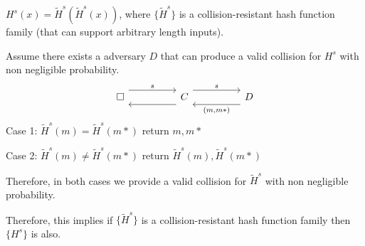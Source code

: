 \documentclass[12pt, letterpaper]{article}
\begin{document}
\begin{subproblem}{}
    $H^s(x) = \widetilde{H}^s(\widetilde{H}^s(x))$, where $\{\widetilde{H}^s\}$ is a collision-resistant hash
    function family (that can support arbitrary length inputs).
\end{subproblem}
\begin{problemproof}
    Assume there exists a adversary $D$ that can produce a valid collision for $H^s$ with non negligible probability.
\[\begin{tikzcd}
	\square && C && D
	\arrow["s", shift left=3, from=1-1, to=1-3]
	\arrow["{}", shift left=3, from=1-3, to=1-1]
	\arrow["s", shift left=3, from=1-3, to=1-5]
	\arrow["{(m,m*)}", shift left=3, from=1-5, to=1-3]
\end{tikzcd}\]
Case 1: $\widetilde{H}^s(m)=\widetilde{H}^s(m*)$ return $m,m*$

Case 2: $\widetilde{H}^s(m)\neq\widetilde{H}^s(m*)$ return $\widetilde{H}^s(m),\widetilde{H}^s(m*)$

Therefore, in both cases we provide a valid collision for $\widetilde{H}^s$ with non negligible probability.

Therefore, this implies if $\{\widetilde{H}^s\}$ is a collision-resistant hash function family then $\{H^s\}$ is also.
\end{problemproof}
\end{document}
